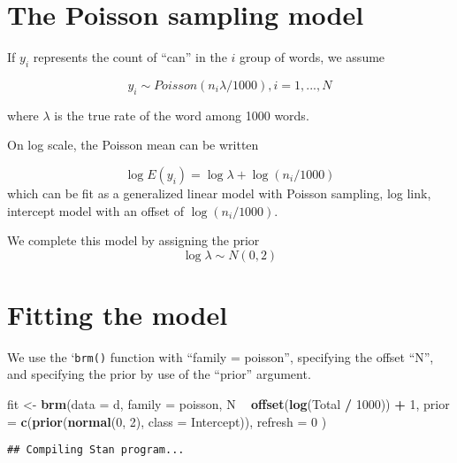 \documentclass[
]{book}
\newenvironment{Shaded}{\begin{snugshade}}{\end{snugshade}}
\newcommand{\DataTypeTok}[1]{\textcolor[rgb]{0.13,0.29,0.53}{#1}}
\newcommand{\DecValTok}[1]{\textcolor[rgb]{0.00,0.00,0.81}{#1}}
\newcommand{\KeywordTok}[1]{\textcolor[rgb]{0.13,0.29,0.53}{\textbf{#1}}}
\newcommand{\NormalTok}[1]{#1}
\newcommand{\OperatorTok}[1]{\textcolor[rgb]{0.81,0.36,0.00}{\textbf{#1}}}
\newcommand{\StringTok}[1]{\textcolor[rgb]{0.31,0.60,0.02}{#1}}
\begin{document}
\hypertarget{the-poisson-sampling-model}{%
\section{The Poisson sampling model}\label{the-poisson-sampling-model}}

If \(y_i\) represents the count of ``can'' in the \(i\) group of words, we assume

\[
y_i  \sim Poisson(n_i \lambda / 1000), i = 1, ..., N
\]

where \(\lambda\) is the true rate of the word among 1000 words.

On log scale, the Poisson mean can be written

\[
\log E(y_i) = \log \lambda + \log(n_i / 1000)
\]
which can be fit as a generalized linear model with Poisson sampling, log link, intercept model with an offset of \(\log(n_i / 1000)\).

We complete this model by assigning the prior
\[
\log \lambda \sim N(0, 2)
\]

\hypertarget{fitting-the-model}{%
\section{Fitting the model}\label{fitting-the-model}}

We use the `\texttt{brm()} function with ``family = poisson'', specifying the offset ``N'', and specifying the prior by use of the ``prior'' argument.

\begin{Shaded}
\begin{Highlighting}[]
\NormalTok{fit <-}\StringTok{ }\KeywordTok{brm}\NormalTok{(}\DataTypeTok{data =}\NormalTok{ d, }\DataTypeTok{family =}\NormalTok{ poisson,}
\NormalTok{    N }\OperatorTok{~}\StringTok{ }\KeywordTok{offset}\NormalTok{(}\KeywordTok{log}\NormalTok{(Total }\OperatorTok{/}\StringTok{ }\DecValTok{1000}\NormalTok{)) }\OperatorTok{+}\StringTok{ }\DecValTok{1}\NormalTok{,}
    \DataTypeTok{prior =} \KeywordTok{c}\NormalTok{(}\KeywordTok{prior}\NormalTok{(}\KeywordTok{normal}\NormalTok{(}\DecValTok{0}\NormalTok{, }\DecValTok{2}\NormalTok{), }
                    \DataTypeTok{class =}\NormalTok{ Intercept)),}
              \DataTypeTok{refresh =} \DecValTok{0}
\NormalTok{    )}
\end{Highlighting}
\end{Shaded}

\begin{verbatim}
## Compiling Stan program...
\end{verbatim}
\end{document}

